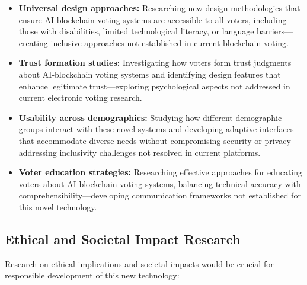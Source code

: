 \documentclass[conference]{IEEEtran}
\begin{document}
\begin{itemize}
    \item \textbf{Universal design approaches:} Researching new design methodologies that ensure AI-blockchain voting systems are accessible to all voters, including those with disabilities, limited technological literacy, or language barriers—creating inclusive approaches not established in current blockchain voting.
    
    \item \textbf{Trust formation studies:} Investigating how voters form trust judgments about AI-blockchain voting systems and identifying design features that enhance legitimate trust—exploring psychological aspects not addressed in current electronic voting research.
    
    \item \textbf{Usability across demographics:} Studying how different demographic groups interact with these novel systems and developing adaptive interfaces that accommodate diverse needs without compromising security or privacy—addressing inclusivity challenges not resolved in current platforms.
    
    \item \textbf{Voter education strategies:} Researching effective approaches for educating voters about AI-blockchain voting systems, balancing technical accuracy with comprehensibility—developing communication frameworks not established for this novel technology.
\end{itemize}

\subsection{Ethical and Societal Impact Research}
Research on ethical implications and societal impacts would be crucial for responsible development of this new technology:
\end{document}
